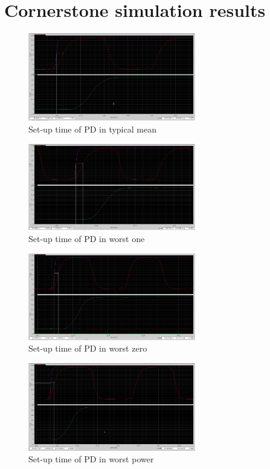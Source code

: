 \documentclass[a4paper,12pt]{article} \usepackage{graphicx}
\begin{document}
\newpage
\section{Cornerstone simulation results}
\label{sec:corners}

\begin{figure}[h]
  \centering
  \includegraphics[width=0.65\textwidth]{../Bilder/Layout/simulations/pd_tm.png}
  \caption{Set-up time of PD in typical mean}
  \label{fig:PDtm}
\end{figure}

\begin{figure}[h]
  \centering
  \includegraphics[width=0.65\textwidth]{../Bilder/Layout/simulations/pd_wo.png}
  \caption{Set-up time of PD in worst one}
  \label{fig:PDwo}
\end{figure}

\begin{figure}[h]
  \centering
  \includegraphics[width=0.65\textwidth]{../Bilder/Layout/simulations/pd_wz.png}
  \caption{Set-up time of PD in worst zero}
  \label{fig:PDwz}
\end{figure}

\begin{figure}[h]
  \centering
  \includegraphics[width=0.65\textwidth]{../Bilder/Layout/simulations/pd_wp.png}
  \caption{Set-up time of PD in worst power}
  \label{fig:PDwp}
\end{figure}
\end{document}
